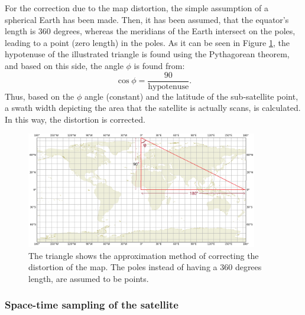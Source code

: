 For the correction due to the map distortion, the simple assumption of a spherical Earth has been made. Then, it has been assumed, that the equator's length is 360 degrees, whereas the meridians of the Earth intersect on the poles, leading to a point (zero length) in the poles. As it can be seen in Figure \ref{correction_map_distortion}, the hypotenuse of the illustrated triangle is found using the Pythagorean theorem, and based on this side, the angle $\phi$ is found from: $$ \cos{\phi} = \frac{90}{\text{hypotenuse}}.$$
Thus, based on the $\phi$ angle (constant) and the latitude of the sub-satellite point, a swath width depicting the area that the satellite is actually scans, is calculated. In this way, the distortion is corrected.

\begin{figure}
\centering
\includegraphics[width=0.9\textwidth]{Images/correction_map_distortion.png}\caption{The triangle shows the approximation method of correcting the distortion of the map. The poles instead of having a 360 degrees length, are assumed to be points.}
\label{correction_map_distortion}
\end{figure}

\bigskip
\subsubsection{Space-time sampling of the satellite}
\bigskip


